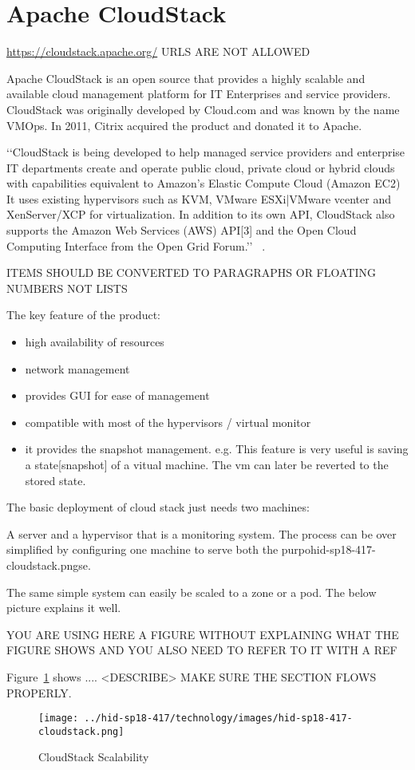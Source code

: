 
\section{Apache CloudStack}

\url{ https://cloudstack.apache.org/} URLS ARE NOT ALLOWED


Apache CloudStack is an open source that provides a highly scalable and available 
cloud management platform for IT
Enterprises and service providers. CloudStack was originally developed by Cloud.com and was known by the name VMOps. 
In 2011, Citrix acquired the product and donated it to Apache. 

‘‘CloudStack is being developed to help managed service providers and enterprise IT 
departments create and operate public cloud, private cloud or hybrid clouds
with capabilities equivalent to Amazon's Elastic Compute Cloud (Amazon EC2)
It uses existing hypervisors such as KVM, VMware ESXi|VMware vcenter and
XenServer/XCP for virtualization. In addition to its own API, CloudStack 
also supports the Amazon Web Services (AWS) API[3] and the Open Cloud Computing Interface from the Open Grid Forum.’’  
~\cite{ hid-sp18-417-wiki-cloudStack}. 

ITEMS SHOULD BE CONVERTED TO PARAGRAPHS OR FLOATING NUMBERS NOT LISTS 

The key feature of the product:
\begin{itemize}
\item        high availability of resources
\item        network management
\item        provides GUI for ease of management
\item        compatible with most of the hypervisors / virtual monitor
\item        it provides the snapshot management. e.g. This feature is 
very useful is saving a state[snapshot] of a vitual machine. 
The vm can later be reverted to the stored state.  
\end{itemize}
 The basic deployment of cloud stack just needs two machines: 
 
 A server and a hypervisor that is a monitoring system. 
 The process can be over simplified by configuring one machine 
 to serve both the purpohid-sp18-417-cloudstack.pngse. 
 
 The same simple system can easily be scaled to a zone or a pod.
 The below picture explains it well.

YOU ARE USING HERE A FIGURE WITHOUT EXPLAINING WHAT THE FIGURE SHOWS AND YOU ALSO NEED TO REFER TO IT WITH A REF

Figure~\ref{F:cloudstack-scalabuility} shows .... <DESCRIBE> MAKE SURE THE SECTION FLOWS PROPERLY.

\begin{figure}[htb]
  \texttt{[image: ../hid-sp18-417/technology/images/hid-sp18-417-cloudstack.png]}
  \caption{CloudStack Scalability ~\cite{hid-sp18-417-cloudstack-scaling}}
  \label{F:cloudstack-scalabuility}
\end{figure}


